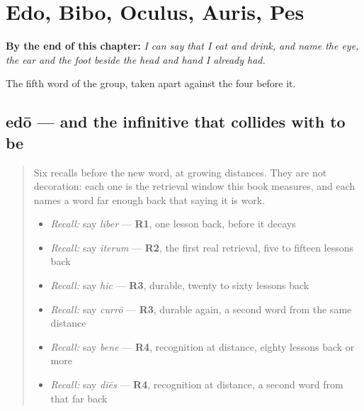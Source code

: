 
\chapter{Edo, Bibo, Oculus, Auris, Pes}
\label{ch:la-corpus}

\begin{chapteropening}
\textbf{By the end of this chapter:} \emph{I can say that I eat and drink, and name the eye, the ear and the foot beside the head and hand I already had.}

The fifth word of the group, taken apart against the four before it.
\end{chapteropening}

\section[edō, esse]{edō — and the infinitive that collides with to be}

\label{lesson:LA-C54-edo}



\begin{quote}
Six recalls before the new word, at growing distances. They are not decoration: each one is the retrieval window this book measures, and each names a word far enough back that saying it is work.

\begin{itemize}
\raggedright
  \item \emph{Recall:} say \emph{liber} — \textbf{R1}, one lesson back, before it decays
  \item \emph{Recall:} say \emph{iterum} — \textbf{R2}, the first real retrieval, five to fifteen lessons back
  \item \emph{Recall:} say \emph{hic} — \textbf{R3}, durable, twenty to sixty lessons back
  \item \emph{Recall:} say \emph{currō} — \textbf{R3}, durable again, a second word from the same distance
  \item \emph{Recall:} say \emph{bene} — \textbf{R4}, recognition at distance, eighty lessons back or more
  \item \emph{Recall:} say \emph{diēs} — \textbf{R4}, recognition at distance, a second word from that far back
\end{itemize}
\end{quote}

